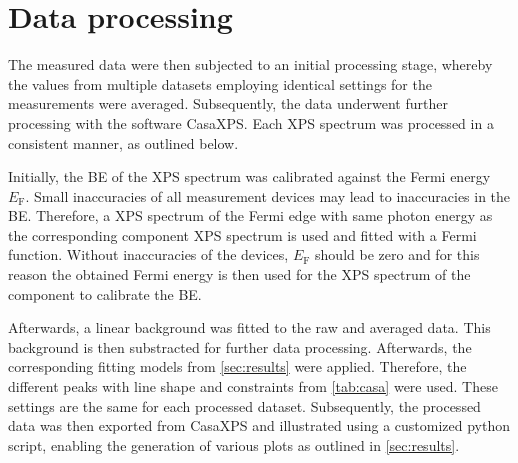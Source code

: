\section{Data processing}

The measured data were then subjected to an initial processing stage, whereby the values from multiple datasets employing identical settings for the measurements were averaged. Subsequently, the data underwent further processing with the software CasaXPS.\autocite{CASA2022} Each XPS spectrum was processed in a consistent manner, as outlined below.

Initially, the \ac{BE} of the \ac{XPS} spectrum was calibrated against the Fermi energy $E_\mathrm{F}$. Small inaccuracies of all measurement devices may lead to inaccuracies in the \ac{BE}. Therefore, a \ac{XPS} spectrum of the Fermi edge with same photon energy as the corresponding component \ac{XPS} spectrum is used and fitted with a Fermi function. Without inaccuracies of the devices, $E_\mathrm{F}$ should be zero and for this reason the obtained Fermi energy is then used for the \ac{XPS} spectrum of the component to calibrate the \ac{BE}.

Afterwards, a linear background was fitted to the raw and averaged data. This background is then substracted for further data processing. Afterwards, the corresponding fitting models from \autoref{sec:results} were applied. Therefore, the different peaks with line shape and constraints from \autoref{tab:casa} were used. These settings are the same for each processed dataset.
Subsequently, the processed data was then exported from CasaXPS and illustrated using a customized python script, enabling the generation of various plots as outlined in \autoref{sec:results}.


